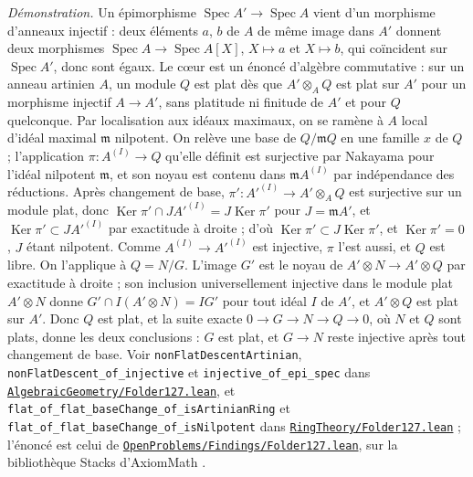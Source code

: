 {\small \emph{Démonstration.} Un épimorphisme $\operatorname{Spec} A' \to \operatorname{Spec} A$ vient d'un morphisme d'anneaux injectif : deux éléments $a$, $b$ de $A$ de même image dans $A'$ donnent deux morphismes $\operatorname{Spec} A \to \operatorname{Spec} A[X]$, $X \mapsto a$ et $X \mapsto b$, qui coïncident sur $\operatorname{Spec} A'$, donc sont égaux. Le cœur est un énoncé d'algèbre commutative : sur un anneau artinien $A$, un module $Q$ est plat dès que $A' \otimes_A Q$ est plat sur $A'$ pour un morphisme injectif $A \to A'$, sans platitude ni finitude de $A'$ et pour $Q$ quelconque. Par localisation aux idéaux maximaux, on se ramène à $A$ local d'idéal maximal $\mathfrak m$ nilpotent. On relève une base de $Q/\mathfrak m Q$ en une famille $x$ de $Q$ ; l'application $\pi : A^{(I)} \to Q$ qu'elle définit est surjective par Nakayama pour l'idéal nilpotent $\mathfrak m$, et son noyau est contenu dans $\mathfrak m A^{(I)}$ par indépendance des réductions. Après changement de base, $\pi' : A'^{(I)} \to A' \otimes_A Q$ est surjective sur un module plat, donc $\operatorname{Ker}\pi' \cap J A'^{(I)} = J \operatorname{Ker}\pi'$ pour $J = \mathfrak m A'$, et $\operatorname{Ker}\pi' \subset J A'^{(I)}$ par exactitude à droite ; d'où $\operatorname{Ker}\pi' \subset J\operatorname{Ker}\pi'$, et $\operatorname{Ker}\pi' = 0$, $J$ étant nilpotent. Comme $A^{(I)} \to A'^{(I)}$ est injective, $\pi$ l'est aussi, et $Q$ est libre. On l'applique à $Q = N/G$. L'image $G'$ est le noyau de $A' \otimes N \to A' \otimes Q$ par exactitude à droite ; son inclusion universellement injective dans le module plat $A' \otimes N$ donne $G' \cap I(A' \otimes N) = IG'$ pour tout idéal $I$ de $A'$, et $A' \otimes Q$ est plat sur $A'$. Donc $Q$ est plat, et la suite exacte $0 \to G \to N \to Q \to 0$, où $N$ et $Q$ sont plats, donne les deux conclusions : $G$ est plat, et $G \to N$ reste injective après tout changement de base. Voir \texttt{nonFlatDescentArtinian}, \texttt{nonFlatDescent\_of\_injective} et \texttt{injective\_of\_epi\_spec} dans \href{\leanblobmain/AlgebraicGeometry/Folder127.lean}{\texttt{AlgebraicGeometry/\allowbreak{}Folder127.\allowbreak{}lean}}, et \texttt{flat\_of\_flat\_baseChange\_of\_isArtinianRing} et \texttt{flat\_of\_flat\_baseChange\_of\_isNilpotent} dans \href{\leanblobmain/RingTheory/Folder127.lean}{\texttt{RingTheory/\allowbreak{}Folder127.\allowbreak{}lean}} ; l'énoncé est celui de \href{https://github.com/Commutator-IO/GrothendieckArchivesProofs/blob/main/OpenProblems/Findings/Folder127.lean}{\texttt{OpenProblems/\allowbreak{}Findings/\allowbreak{}Folder127.\allowbreak{}lean}}, sur la bibliothèque Stacks d'AxiomMath \cite{axiomstacks}.

}
